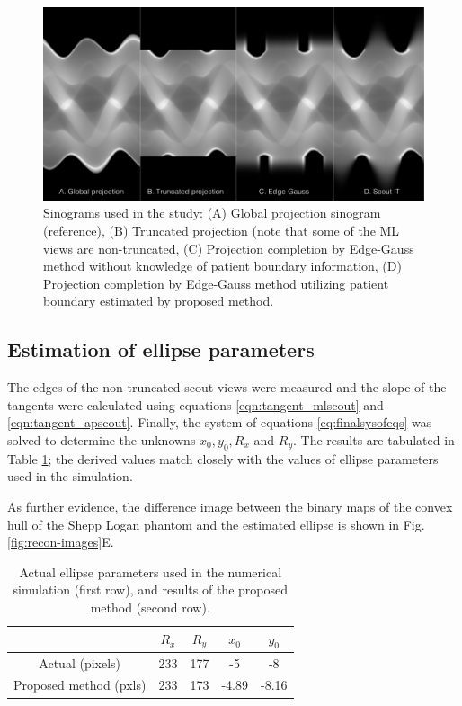 \documentclass[]{spie}
\begin{document}
\begin{figure}[hbtp]
\centering
\includegraphics[width=15 cm]{figures/figuresScoutIT-sinograms}
\caption{Sinograms used in the study: (A) Global projection sinogram (reference), (B) Truncated projection (note that some of the ML views are non-truncated, (C) Projection completion by Edge-Gauss method without knowledge of patient boundary information, (D) Projection completion by Edge-Gauss method utilizing patient boundary estimated by proposed method. \label{fig:sinograms}
}
\end{figure}

\subsection{Estimation of ellipse parameters}

The edges of the non-truncated scout views were measured and the slope of the tangents were calculated using equations \ref{eqn:tangent_mlscout} and \ref{eqn:tangent_apscout}. Finally, the system of equations \ref{eq:finalsysofeqs} was solved to determine the unknowns $x_0, y_0, R_x$ and $R_y$. The results are tabulated in Table \ref{tab:ellipse_params}; the derived values match closely with the values of ellipse parameters used in the simulation. 

As further evidence, the difference image between the binary maps of the convex hull of the Shepp Logan phantom and the estimated ellipse is shown in Fig. \ref{fig:recon-images}E. 

\begin{table}
\begin{center}
\begin{tabular}{|c|c|c|c|c|}
\hline 
 & \textbf{$R_x$} & \textbf{$R_y$} & \textbf{$x_0$} & \textbf{$y_0$} \\ 
\hline 
Actual (pixels) & 233 & 177 & -5 & -8 \\ 
\hline 
Proposed method (pxls) & 233 & 173 & -4.89 & -8.16 \\ 
\hline 
\end{tabular} 
\caption{\label{tab:ellipse_params} Actual ellipse parameters used in the numerical simulation (first row), and results of the proposed method (second row).}
\end{center}
\end{table}
\end{document}
